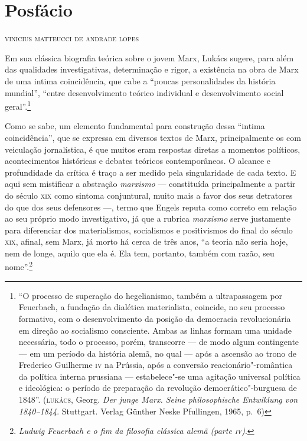 \pagebreak
\thispagestyle{empty}
\movetooddpage
\chapter[Posfácio, \emph{por Vinicius Matteucci de Andrade Lopes}]{Posfácio }

\begin{flushright}
\textsc{vinicius matteucci de andrade lopes}
\end{flushright}

\noindent{}Em sua clássica biografia teórica sobre o jovem Marx, Lukács sugere,
para além das qualidades investigativas, determinação e rigor, a
existência na obra de Marx de uma intima coincidência, que cabe a
``poucas personalidades da história mundial'', ``entre desenvolvimento
teórico individual e desenvolvimento social geral''.\footnote{``O
  processo de superação do hegelianismo, também a ultrapassagem por
  Feuerbach, a fundação da dialética materialista, coincide, no seu
  processo formativo, com o desenvolvimento da posição da democracia
  revolucionária em direção ao socialismo consciente. Ambas as linhas
  formam uma unidade necessária, todo o processo, porém, transcorre --- %
  de modo algum contingente --- em um período da história alemã, no qual %
  --- após a ascensão ao trono de Frederico Guilherme \textsc{iv} na
  Prússia, após a conversão reacionário"-romântica da política interna %
  prussiana --- estabelece"-se uma agitação universal política e
  ideológica: o período de preparação da revolução democrático"-burguesa
  de 1848''. (\textsc{lukács}, Georg. \emph{Der junge Marx. Seine
  philosophische Entwiklung von 1840--1844}. Stuttgart. Verlag Günther
  Neske Pfullingen, 1965, p.~6)}

Como se sabe, um elemento fundamental para construção dessa ``intima
coincidência'', que se expressa em diversos textos de Marx,
principalmente os com veiculação jornalística, é que muitos eram
respostas diretas a momentos políticos, acontecimentos históricas e
debates teóricos contemporâneos. O alcance e profundidade da crítica é
traço a ser medido pela singularidade de cada texto. E aqui sem
mistificar a abstração \emph{marxismo} --- constituída principalmente a
partir do século \textsc{xix} como sintoma conjuntural, muito mais a
favor dos seus detratores do que dos seus defensores ---, termo que
Engels reputa como correto em relação ao seu próprio modo investigativo,
já que a rubrica \emph{marxismo} serve justamente para diferenciar dos %
materialismos, socialismos e positivismos do final do século
\textsc{xix}, afinal, sem Marx, já morto há cerca de três anos, ``a
teoria não seria hoje, nem de longe, aquilo que ela é. Ela tem,
portanto, também com razão, seu nome''.\footnote{\emph{Ludwig Feuerbach
  e o fim da filosofia clássica alemã (parte \textsc{iv})}.}

